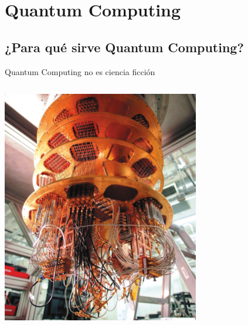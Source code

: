 \documentclass[11pt,compress]{beamer}
\begin{document}

\section{Quantum Computing}

\subsection{¿Para qué sirve Quantum Computing?}

\begin{frame}{Quantum Computing no es ciencia ficción}

  \begin{columns}
    \begin{center}
    \includegraphics[width=0.85\textwidth]{./images/google-cryostats-2.png}


\end{center}
\end{columns}
\end{frame}
\end{document}
